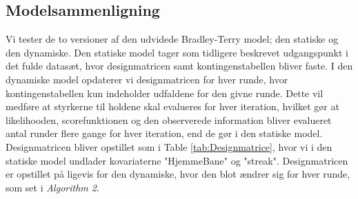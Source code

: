 \documentclass[11pt,a4paper]{article}
\begin{document}
\subsection{Modelsammenligning}
Vi tester de to versioner af den udvidede Bradley-Terry model; den statiske og den dynamiske. Den statiske model tager som tidligere beskrevet udgangspunkt i det fulde datasæt, hvor designmatricen samt kontingenstabellen bliver faste. I den dynamiske model opdaterer vi designmatricen for hver runde, hvor kontingenstabellen kun indeholder udfaldene for den givne runde. Dette vil medføre at styrkerne til holdene skal evalueres for hver iteration, hvilket gør at likelihooden, scorefunktionen og den observerede information bliver evalueret antal runder flere gange for hver iteration, end de gør i den statiske model.\\
Designmatricen bliver opstillet som i Table \ref{tab:Designmatrice}, hvor vi i den statiske model undlader kovariaterne "HjemmeBane" og "streak". Designmatricen er opstillet på ligevis for den dynamiske, hvor den blot ændrer sig for hver runde, som set i \textit{Algorithm 2}.
\end{document}
